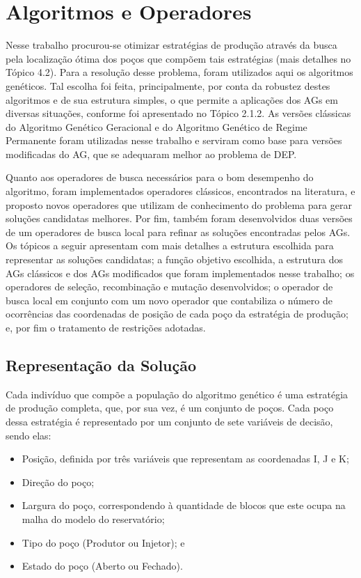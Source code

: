 \chapter{Algoritmos e Operadores}
\label{ch:3_AlgoritmosOperadores}
Nesse trabalho procurou-se otimizar estratégias de produção através da busca pela localização ótima dos poços que compõem tais estratégias (mais detalhes no Tópico 4.2). Para a resolução desse problema, foram utilizados aqui os algoritmos genéticos. Tal escolha foi feita, principalmente, por conta da robustez destes algoritmos e de sua estrutura simples, o que permite a aplicações dos AGs em diversas situações, conforme foi apresentado no Tópico 2.1.2. As versões clássicas do Algoritmo Genético Geracional e do Algoritmo Genético de Regime Permanente foram utilizadas nesse trabalho e serviram como base para versões modificadas do AG, que se adequaram melhor ao problema de DEP.

Quanto aos operadores de busca necessários para o bom desempenho do algoritmo, foram implementados operadores clássicos, encontrados na literatura, e proposto novos operadores que utilizam de conhecimento do problema para gerar soluções candidatas melhores. Por fim, também foram desenvolvidos duas versões de um operadores de busca local para refinar as soluções encontradas pelos AGs. Os tópicos a seguir apresentam com mais detalhes a estrutura escolhida para representar as soluções candidatas; a função objetivo escolhida, a estrutura dos AGs clássicos e dos AGs modificados que foram implementados nesse trabalho; os operadores de seleção, recombinação e mutação desenvolvidos; o operador de busca local em conjunto com um novo operador que contabiliza o número de ocorrências das coordenadas de posição de cada poço da estratégia de produção; e, por fim o tratamento de restrições adotadas.  

\section{Representação da Solução}
\label{ch:3_Representacao}
Cada indivíduo que compõe a população do algoritmo genético é uma estratégia de produção completa, que, por sua vez, é um conjunto de poços. Cada poço dessa estratégia é representado por um conjunto de sete variáveis de decisão, sendo elas:

\begin{itemize}

\item Posição, definida por três variáveis que representam as coordenadas I, J e K;
\item Direção do poço;
\item Largura do poço, correspondendo à quantidade de blocos que este ocupa na malha do modelo do reservatório; 
\item Tipo do poço (Produtor ou Injetor); e
\item Estado do poço (Aberto ou Fechado).

\end{itemize}

